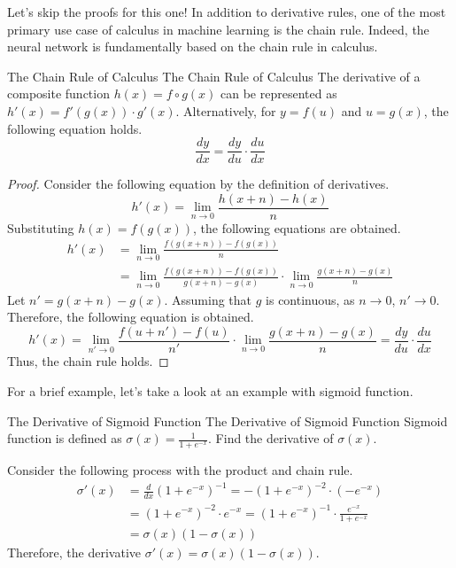 \documentclass[../../../main.tex]{subfiles}
\begin{document}
Let's skip the proofs for this one! In addition to derivative rules,
one of the most primary use case of calculus in machine learning is
the chain rule. Indeed, the neural network is fundamentally based on
the chain rule in calculus.

\begin{theorem}
{The Chain Rule of Calculus}
{The Chain Rule of Calculus}
The derivative of a composite function $h(x) = f \circ g (x)$ can be
represented as $h'(x) = f'(g(x)) \cdot g'(x)$. Alternatively,
for $y = f(u)$ and $u = g(x)$, the following equation holds.
\[
\frac{dy}{dx} = \frac{dy}{du} \cdot \frac{du}{dx}
\]
\end{theorem}
\begin{proof}
Consider the following equation by the definition of derivatives.
\[
h'(x)
= \lim_{n \to 0} \frac{h(x + n) - h(x)}{n}
\]
Substituting $h(x) = f(g(x))$, the following equations are obtained.
\begin{align*}
h'(x)
&= \lim_{n \to 0} \frac{f(g(x + n)) - f(g(x))}{n} \\
&= \lim_{n \to 0} \frac{f(g(x + n)) - f(g(x))}{g(x + n) - g(x)} \cdot
    \lim_{n \to 0} \frac{g(x + n) - g(x)}{n}
\end{align*}
Let $n' = g(x + n) - g(x)$. Assuming that $g$ is continuous,
as $n \to 0$, $n' \to 0$. Therefore, the following equation is
obtained.
\[
h'(x)
= \lim_{n' \to 0} \frac{f(u + n') - f(u)}{n'} \cdot
    \lim_{n \to 0} \frac{g(x + n) - g(x)}{n}
= \frac{dy}{du} \cdot \frac{du}{dx}
\]
Thus, the chain rule holds.
\end{proof}

For a brief example, let's take a look at an example with sigmoid
function.

\begin{problem}
{The Derivative of Sigmoid Function}
{The Derivative of Sigmoid Function}
Sigmoid function is defined as $\sigma(x) = \frac{1}{1 + e^{-x}}$.
Find the derivative of $\sigma(x)$.
\end{problem}
\begin{solution}
Consider the following process with the product and chain rule.
\begin{align*}
    \sigma'(x)
    &= \frac{d}{dx} \left( 1 + e^{-x} \right)^{-1}
    = - \left( 1 + e^{-x} \right)^{-2} \cdot \left( -e^{-x} \right) \\
    &= \left( 1 + e^{-x} \right)^{-2} \cdot e^{-x}
    = \left( 1 + e^{-x} \right)^{-1} \cdot
        \frac{e^{-x}}{1 + e^{-x}} \\
    &= \sigma(x) \left( 1 - \sigma(x) \right)
\end{align*}
Therefore, the derivative $\sigma'(x) = \sigma(x) (1 - \sigma(x))$.
\end{solution}
\end{document}
